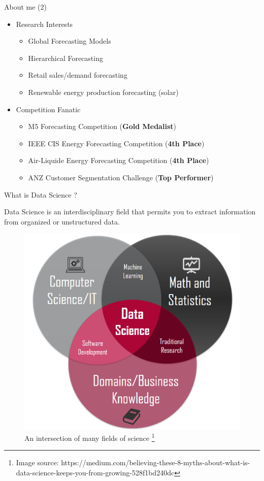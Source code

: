 \documentclass[12pt,ignorenonframetext,]{beamer}
\providecommand{\tightlist}{%
  \setlength{\itemsep}{0pt}\setlength{\parskip}{0pt}}
\begin{document}
\begin{frame}{About me (2)}
\protect\hypertarget{about-me-2}{}

\begin{itemize}
\tightlist
\item
  Research Interests

  \begin{itemize}
  \tightlist
  \item
    Global Forecasting Models
  \item
    Hierarchical Forecasting
  \item
    Retail sales/demand forecasting
  \item
    Renewable energy production forecasting (solar)
  \end{itemize}
\item
  Competition Fanatic

  \begin{itemize}
  \tightlist
  \item
    M5 Forecasting Competition (\textbf{Gold Medalist})
  \item
    IEEE CIS Energy Forecasting Competition (\textbf{4th Place})
  \item
    Air-Liquide Energy Forecasting Competition (\textbf{4th Place})
  \item
    ANZ Customer Segmentation Challenge (\textbf{Top Performer})
  \end{itemize}
\end{itemize}

\end{frame}

\begin{frame}{What is Data Science ?}
\protect\hypertarget{what-is-data-science}{}

Data Science is an interdisciplinary field that permits you to extract
information from organized or unstructured data.

\begin{figure}
  \includegraphics[width=.5\textwidth,height=.5\textheight,keepaspectratio]{images/datascience.jpeg}
  \caption{An intersection of many fields of science%
    \footnote{%
     \tiny{Image source: https://medium.com/believing-these-8-myths-about-what-is-data-science-keeps-you-from-growing-528f1bd240dc} 
    }%
  }
\end{figure}

\end{frame}
\end{document}
